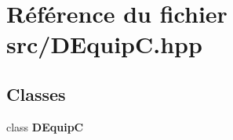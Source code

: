 \section{Référence du fichier src/\-D\-Equip\-C.hpp}
\label{_d_equip_c_8hpp}
\subsection*{Classes}
\begin{DoxyCompactItemize}
\item 
class {\bf D\-Equip\-C}
\end{DoxyCompactItemize}

